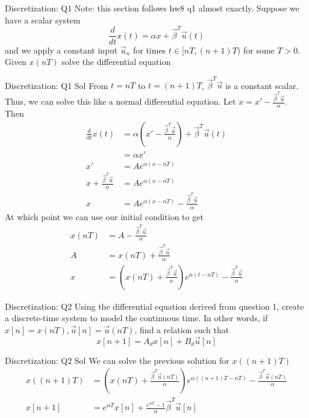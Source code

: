 \documentclass{beamer}
\begin{document}
	\begin{frame}{Discretization: Q1}
	Note: this section follows hw8 q1 almost exactly. Suppose we have a scalar system
	\[ \frac{d}{dt} x(t) = \alpha x + \vec{\beta}^T \vec u(t) \]
	and we apply a constant input $\vec{u}_n$ for times $t \in [nT, (n + 1)T)$ for some $T > 0$. Given $x(nT)$ solve the differential equation
	\end{frame}\begin{frame}{Discretization: Q1 Sol}
	From $t = nT$ to $t = (n + 1)T$, $\vec{\beta}^T \vec{u}$ is a constant scalar. Thus, we can solve this like a normal differential equation. Let $x = x' - \frac{\vec \beta^T \vec u}{\alpha}$. Then
	\begin{align*}
	\frac{d}{dt} x(t) &= \alpha (x' - \frac{\vec \beta^T \vec u}{\alpha}) + \vec{\beta}^T \vec u(t) \\
	&= \alpha x' \\
	x' &= A e^{\alpha (x - nT)} \\
	x + \frac{\vec \beta^T \vec u}{\alpha} &= A e^{\alpha (x - nT)} \\
	x &= A e^{\alpha (x - nT)} - \frac{\vec \beta^T \vec u}{\alpha}
	\end{align*}
	At which point we can use our initial condition to get
	\begin{align*}
	x(nT) &= A - \frac{\vec \beta^T \vec u}{\alpha} \\
	A &= x(nT) + \frac{\vec \beta^T \vec u}{\alpha} \\
	x &= \left( x(nT) + \frac{\vec \beta^T \vec u}{\alpha} \right) e^{\alpha (t - nT)} - \frac{\vec \beta^T \vec u}{\alpha}
	\end{align*}
	\end{frame}\begin{frame}{Discretization: Q2}
	Using the differential equation derived from question 1, create a discrete-time system to model the continuous time. In other words, if $x[n] = x(nT), \vec{u}[n] = \vec{u}(nT)$, find a relation such that
	\[ x[n + 1] = A_d x[n] + B_d \vec{u}[n] \]
	\end{frame}\begin{frame}{Discretization: Q2 Sol}
	We can solve the previous solution for $x((n + 1)T)$
	\begin{align*}
	x((n + 1)T) &= \left( x(nT) + \frac{\vec \beta^T \vec u(nT)}{\alpha} \right) e^{\alpha ((n + 1)T - nT)} - \frac{\vec \beta^T \vec u(nT)}{\alpha} \\
	x[n + 1] &= e^{\alpha T} x[n] + \frac{e^{\alpha T} - 1}{\alpha} \vec{\beta}^T \vec{u}[n] \\

\end{align*}
\end{frame}
\end{document}
